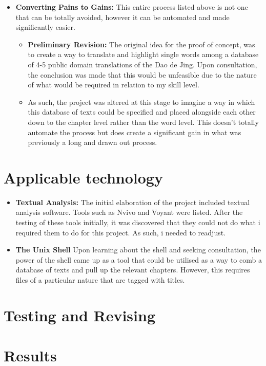 \documentclass{article}
\begin{document}
\begin{itemize}

\item{\textbf{Converting Pains to Gains:} This entire process listed above is not one that can be totally avoided, however it can be automated and made significantly easier.}

\begin{itemize}

\item{\textbf{Preliminary Revision:} The original idea for the proof of concept, was to create a way to translate and highlight single words among a database of 4-5 public domain translations of the Dao de Jing. Upon consultation, the conclusion was made that this would be unfeasible due to the nature of what would be required in relation to my skill level.}

\item{As such, the project was altered at this stage to imagine a way in which this database of texts could be specified and placed alongside each other down to the chapter level rather than the word level. This doesn't totally automate the process but does create a significant gain in what was previously a long and drawn out process.}


\end{itemize}

\end{itemize}

\section{Applicable technology}

\begin{itemize}

\item{\textbf{Textual Analysis:} The initial elaboration of the project included textual analysis software. Tools such as Nvivo and Voyant were listed. After the testing of these tools initially, it was discovered that they could not do what i required them to do for this project. As such, i needed to readjust.}

\item{\textbf{The Unix Shell} Upon learning about the shell and seeking consultation, the power of the shell came up as a tool that could be utilised as a way to comb a database of texts and pull up the relevant chapters. However, this requires files of a particular nature that are tagged with titles.}

\end{itemize}

\section{Testing and Revising}







\section{Results}
\end{document}
